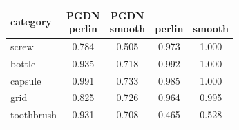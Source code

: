 \setlength{\tabcolsep}{3pt}
\begin{tabular}{@{}lcccc@{}}
\toprule
category & \shortstack{PGDN\\perlin} & \shortstack{PGDN\\smooth} & \shortstack{\draem{}\\perlin} & \shortstack{\draem{}\\smooth} \\
\midrule
screw & 0.784 & 0.505 & 0.973 & 1.000 \\
bottle & 0.935 & 0.718 & 0.992 & 1.000 \\
capsule & 0.991 & 0.733 & 0.985 & 1.000 \\
grid & 0.825 & 0.726 & 0.964 & 0.995 \\
toothbrush & 0.931 & 0.708 & 0.465 & 0.528 \\
\bottomrule
\end{tabular}
